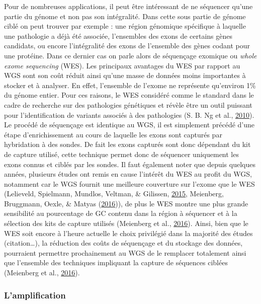 \documentclass[12pt,twoside]{reedthesis}
\theoremstyle{definition}
\theoremstyle{definition}
\theoremstyle{remark}
\begin{document}
  Pour de nombreuses applications, il peut être intéressant de ne
  séquencer qu'une partie du génome et non pas son intégralité. Dans cette
  sous partie de génome ciblé on peut trouver par exemple : une région
  génomique spécifique à laquelle une pathologie a déjà été associée,
  l'ensembles des exons de certains gènes candidats, ou encore
  l'intégralité des exons de l'ensemble des gènes codant pour une
  protéine. Dans ce dernier cas on parle alors de séquençage exomique ou
  \emph{whole exome sequencing} (WES). Les principaux avantages du WES par
  rapport au WGS sont son coût réduit ainsi qu'une masse de données moins
  importantes à stocker et à analyser. En effet, l'ensemble de l'exome ne
  représente qu'environ 1\% du génome entier. Pour ces raisons, le WES
  considéré comme le standard dans le cadre de recherche sur des
  pathologies génétiques et révèle être un outil puissant pour
  l'identification de variants associés à des pathologies (S. B. Ng et
  al., \protect\hyperlink{ref-Ng2010}{2010}). Le procédé de séquençage est
  identique au WGS, il est simplement précédé d'une étape d'enrichissement
  au cours de laquelle les exons sont capturés par hybridation à des
  sondes. De fait les exons capturés sont donc dépendant du kit de capture
  utilisé, cette technique permet donc de séquencer uniquement les exons
  connus et ciblés par les sondes. Il faut également noter que depuis
  quelques années, plusieurs études ont remis en cause l'intérêt du WES au
  profit du WGS, notamment car le WGS fournit une meilleure couverture sur
  l'exome que le WES (Lelieveld, Spielmann, Mundlos, Veltman, \& Gilissen,
  \protect\hyperlink{ref-Lelieveld2015}{2015}, Meienberg, Bruggmann,
  Oexle, \& Matyas (\protect\hyperlink{ref-Meienberg2016}{2016})), de plus
  le WES montre une plus grande sensibilité au pourcentage de GC contenu
  dans la région à séquencer et à la sélection des kits de capture
  utilisés (Meienberg et al.,
  \protect\hyperlink{ref-Meienberg2016}{2016}). Ainsi, bien que le WES
  soit encore à l'heure actuelle le choix privilégié dans la majorité des
  études (citation\ldots{}), la réduction des coûts de séquençage et du
  stockage des données, pourraient permettre prochainement au WGS de le
  remplacer totalement ainsi que l'ensemble des techniques impliquant la
  capture de séquences ciblées (Meienberg et al.,
  \protect\hyperlink{ref-Meienberg2016}{2016}).
  
  \subsubsection{L'amplification}\label{lamplification}
  
\end{document}
